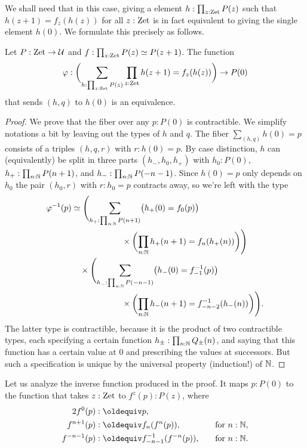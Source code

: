 \documentclass[a4,12pt]{amsart}
\begin{document}
We shall need that in this case, giving a element $h:\prod_{z:\mathrm{Zet}}P(z)$
such that $h(z+1) = f_z(h(z))$ for all $z:\mathrm{Zet}$
is in fact equivalent to giving the single element $h(0)$.
We formulate this precisely as follows.

\begin{theorem}\label{thm:integers-univ-symm}
  Let $P : \mathrm{Zet} \to \mathcal{U}$ and $f : \prod_{z:\mathrm{Zet}}P(z) \simeq P(z+1)$. The function
  \[
    \varphi : \biggl(\sum_{h:\prod_{z:\mathrm{Zet}}P(z)}\prod_{z:\mathrm{Zet}}h(z+1) = f_z(h(z))\biggr) \to P(0)
  \]
  that sends $(h,q)$ to $h(0)$ is an equivalence.
\end{theorem}
\begin{proof}
  We prove that the fiber over any $p : P(0)$ is contractible.
  We simplify notations a bit by leaving out the types of $h$ and $q$.
  The fiber $\sum_{(h,q)} h(0)=p$ consists of a triples $(h,q,r)$ with $r : h(0) = p$.
  By case distinction, $h$ can (equivalently) be split in three parts $(h_-,h_0,h_+)$
  with $h_0 : P(0)$, $h_+ : \prod_{n:\mathbb{N}}P(n+1)$,  and $h_- : \prod_{n:\mathbb{N}} P(-n-1)$. 
  Since $h(0)=p$ only depends on $h_0$ the pair $(h_0,r)$ with  $r : h_0 = p$
  contracts away, so we're left with the type
  \begin{align*}
    \varphi^{-1}(p)
    &\simeq
      \Biggl(\sum_{h_+ : \prod_{n:\mathbb{N}}P(n+1)}
      \bigl(h_+(0) = f_0(p)\bigr) \\
    &\qquad\qquad\qquad
      \times \biggl(\prod_{n:\mathbb{N}}h_+(n+1) = f_n(h_+(n))\biggr)\Biggr) \\
    &\quad\times
      \Biggl(\sum_{h_- : \prod_{n:\mathbb{N}}P(-n-1)}
      \bigl(h_-(0) = f_{-1}^{-1}(p)\bigr) \\
    &\qquad\qquad\qquad
      \times \biggl(\prod_{n:\mathbb{N}}h_-(n+1) = f_{-n-2}^{-1}(h_-(n))\biggr)\Biggr).
  \end{align*}
  The latter type is contractible, because it is the product of two contractible types,
  each specifying a certain function $h_{\pm}:\prod_{n:\mathbb{N}}Q_{\pm}(n)$,
  and saying that this function has a certain value at $0$
  and prescribing the values at successors.
  But such a specification is unique by the universal property (induction!) of $\mathbb{N}$.
\end{proof}
Let us analyze the inverse function produced in the proof.
It maps $p : P(0)$ to the function that takes $z:\mathrm{Zet}$ to $f^z(p):P(z)$, where
\begin{alignat*}2
  f^0(p) &\defeq p, && \\
  f^{n+1}(p) &\defeq f_n(f^n(p)),&\quad&\text{for $n:\NN$,} \\
  f^{-n-1}(p) &\defeq f_{-n-1}^{-1}(f^{-n}(p)),&\quad&\text{for $n:\NN$.}
\end{alignat*}
\end{document}
